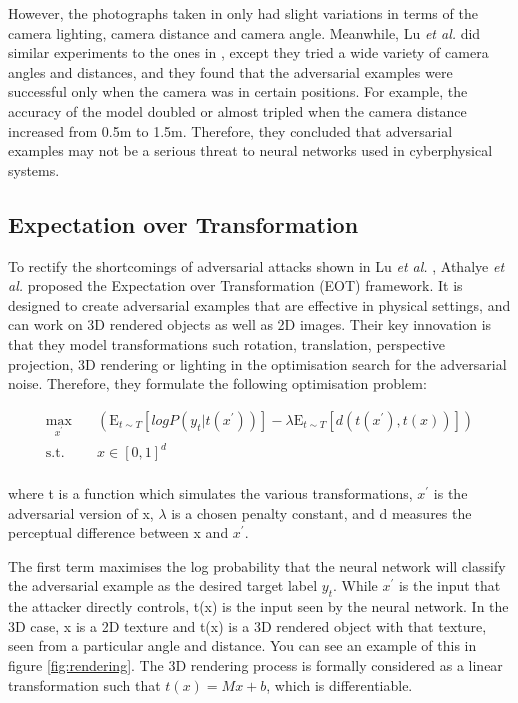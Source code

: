 However, the photographs taken in \cite{kurakin2016adversarial} only had slight variations in terms of the camera lighting, camera distance and camera angle. Meanwhile, Lu \textit{et al.} \cite{lu_physical_experiments} did similar experiments to the ones in \cite{kurakin2016adversarial}, except they tried a wide variety of camera angles and distances, and they found that the adversarial examples were successful only when the camera was in certain positions. For example, the accuracy of the model doubled or almost tripled when the camera distance increased from 0.5m to 1.5m. Therefore, they concluded that adversarial examples may not be a serious threat to neural networks used in cyberphysical systems.

\subsection{Expectation over Transformation}
    \label{subsubsec:eot}

To rectify the shortcomings of adversarial attacks shown in Lu \textit{et al.} \cite{lu_physical_experiments}, Athalye \textit{et al.} \cite{athalye} proposed the Expectation over Transformation (EOT) framework. It is designed to create adversarial examples that are effective in physical settings, and can work on 3D rendered objects as well as 2D images. Their key innovation is that they model transformations such rotation, translation, perspective projection, 3D rendering or lighting in the optimisation search for the adversarial noise. Therefore, they formulate the following optimisation problem:

\begin{equation}
\begin{aligned}
\max_{x^\prime} \quad & (\mathrm{E}_{t\sim T}[log P(y_{t} | t(x^\prime))] - \lambda \mathrm{E}_{t\sim T}[d(t(x^\prime), t(x))])\\
\textrm{s.t.} \quad & x \in [0, 1]^d   \\
\end{aligned}
\end{equation}

\noindent where t is a function which simulates the various transformations, $x^\prime$ is the adversarial version of x, $\lambda$ is a chosen penalty constant, and d measures the perceptual difference between x and $x^\prime$. 

The first term maximises the log probability that the neural network will classify the adversarial example as the desired target label $y_{t}$. While $x^\prime$ is the input that the attacker directly controls, t(x) is the input seen by the neural network. In the 3D case, x is a 2D texture and t(x) is a 3D rendered object with that texture, seen from a particular angle and distance. You can see an example of this in figure \ref{fig:rendering}. The 3D rendering process is formally considered as a linear transformation such that $t(x) = Mx + b$, which is differentiable.

